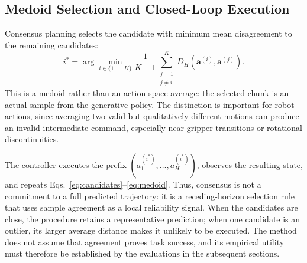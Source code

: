 \documentclass{article}
\begin{document}
\subsection{Medoid Selection and Closed-Loop Execution}

Consensus planning selects the candidate with minimum mean disagreement to the
remaining candidates:
\begin{equation}
    i^* = \arg\min_{i\in\{1,\ldots,K\}}
    \frac{1}{K-1}\sum_{\substack{j=1 \\ j\neq i}}^K
    D_H\!\left(\mathbf{a}^{(i)},\mathbf{a}^{(j)}\right).
    \label{eq:medoid}
\end{equation}
This is a medoid rather than an action-space average: the selected chunk is an
actual sample from the generative policy. The distinction is important for
robot actions, since averaging two valid but qualitatively different motions can
produce an invalid intermediate command, especially near gripper transitions or
rotational discontinuities.

The controller executes the prefix
$\left(a^{(i^*)}_1,\ldots,a^{(i^*)}_H\right)$, observes the resulting state,
and repeats Eqs.~\eqref{eq:candidates}--\eqref{eq:medoid}. Thus, consensus is
not a commitment to a full predicted trajectory: it is a receding-horizon
selection rule that uses sample agreement as a local reliability signal. When
the candidates are close, the procedure retains a representative prediction;
when one candidate is an outlier, its larger average distance makes it unlikely
to be executed. The method does not assume that agreement proves task success,
and its empirical utility must therefore be established by the evaluations in
the subsequent sections.

\printbibliography
\end{document}
